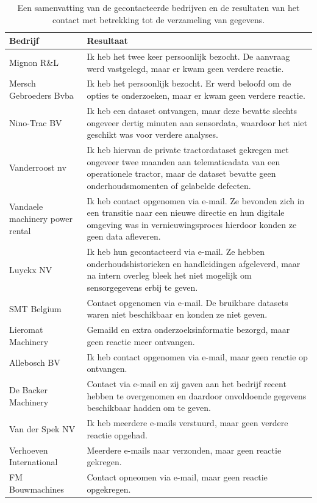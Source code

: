 \begin{table}
    \centering
    \begin{tabular}{l p{10cm}} %
        \toprule
        \textbf{Bedrijf} & \textbf{Resultaat} \\
        \midrule
        Mignon R\&L & Ik heb het twee keer persoonlijk bezocht. De aanvraag werd vastgelegd, maar er kwam geen verdere reactie. \\
        Mersch Gebroeders Bvba & Ik heb het persoonlijk bezocht. Er werd beloofd om de opties te onderzoeken, maar er kwam geen verdere reactie. \\
        Nino-Trac BV & Ik heb een dataset ontvangen, maar deze bevatte slechts ongeveer dertig minuten aan sensordata, waardoor het niet geschikt was voor verdere analyses. \\
        Vanderroost nv & Ik heb hiervan de private tractordataset gekregen met ongeveer twee maanden aan telematicadata van een operationele tractor, maar de dataset bevatte geen onderhoudsmomenten of gelabelde defecten. \\
        Vandaele machinery power rental & Ik heb contact opgenomen via e-mail. Ze bevonden zich in een transitie naar een nieuwe directie en hun digitale omgeving was in vernieuwingsproces hierdoor konden ze geen data afleveren. \\
        Luyckx NV & Ik heb hun gecontacteerd via e-mail. Ze hebben onderhoudshistorieken en handleidingen afgeleverd, maar na intern overleg bleek het niet mogelijk om sensorgegevens erbij te geven. \\
        SMT Belgium & Contact opgenomen via e-mail. De bruikbare datasets waren niet beschikbaar en konden ze niet geven. \\
        Lieromat Machinery & Gemaild en extra onderzoeksinformatie bezorgd, maar geen reactie meer ontvangen. \\
        Allebosch BV & Ik heb contact opgenomen via e-mail, maar geen reactie op ontvangen. \\
        De Backer Machinery & Contact via e-mail en zij gaven aan het bedrijf recent hebben te overgenomen en daardoor onvoldoende gegevens beschikbaar hadden om te geven. \\
        Van der Spek NV & Ik heb meerdere e-mails verstuurd, maar geen verdere reactie opgehad. \\
        Verhoeven International & Meerdere e-mails naar verzonden, maar geen reactie gekregen. \\
        FM Bouwmachines & Contact opneomen via e-mail, maar geen reactie opgekregen. \\
        \bottomrule
    \end{tabular}
    \caption[Tabel: gecontacteerde bedrijven]{\label{tab:gecontacteerde-bedrijven}Een samenvatting van de gecontacteerde bedrijven en de resultaten van het contact met betrekking tot de verzameling van gegevens.}
\end{table}

